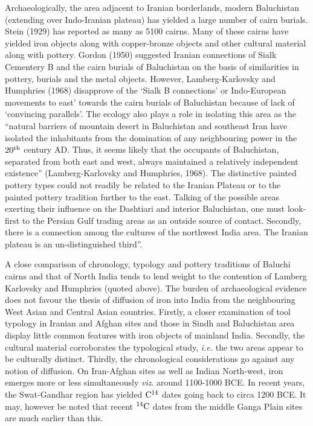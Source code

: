 Archaeologically, the area adjacent to Iranian borderlands, modern Baluchistan (extending over Indo-Iranian plateau) has yielded a large number of cairn burials. Stein (1929) has reported as many as 5100 cairns. Many of these cairns have yielded iron objects along with copper-bronze objects and other cultural material along with pottery. Gordon (1950) suggested Iranian connections of Sialk Cementery B and the cairn burials of Baluchistan on the basis of similarities in pottery, burials and the metal objects. However, Lamberg-Karlovsky and Humphries (1968) disapprove of the ‘Sialk B connections’ or Indo-European movements to east’ towards the cairn burials of Baluchistan because of lack of ‘convincing parallels’. The ecology also plays a role in isolating this area as the “natural barriers of mountain desert in Baluchistan and southeast Iran have isolated the inhabitants from the domination of any neighbouring power in the $20^{\rm th}$ century AD. Thus, it seems likely that the occupants of Baluchistan, separated from both east and west, always maintained a relatively independent existence” (Lamberg-Karlovsky and Humphries, 1968). The distinctive painted pottery types could not readily be related to the Iranian Plateau or to the painted pottery tradition further to the east. Talking of the possible areas exerting their influence on the Dashtiari and interior Baluchistan, one must look-first to the Persian Gulf trading areas as an outside source of contact. Secondly, there is a connection among the cultures of the northwest India area. The Iranian plateau is an un-distinguished third”.

A close comparison of chronology, typology and pottery traditions of Baluchi cairns and that of North India tends to lend weight to the contention of Lamberg Karlovsky and Humphries (quoted above). The burden of archaeological evidence does not favour the thesis of diffusion of iron into India from the neighbouring West Asian and Central Asian countries. Firstly, a closer examination of tool typology in Iranian and Afghan sites and those in Sindh and Baluchistan area display little common features with iron objects of mainland India. Secondly, the cultural material corroborates the typological study, \textit{i.e.} the two areas appear to be culturally distinct. Thirdly, the chronological considerations go against any notion of diffusion. On Iran-Afghan sites as well as Indian North-west, iron emerges more or less simultaneously \textit{viz}. around 1100-1000 BCE. In recent years, the Swat-Gandhar region has yielded ${\rm C}^{\rm 14}$ dates going back to circa 1200 BCE. It may, however be noted that recent $^{14}{\rm C}$ dates from the middle Ganga Plain sites are much earlier than this.

